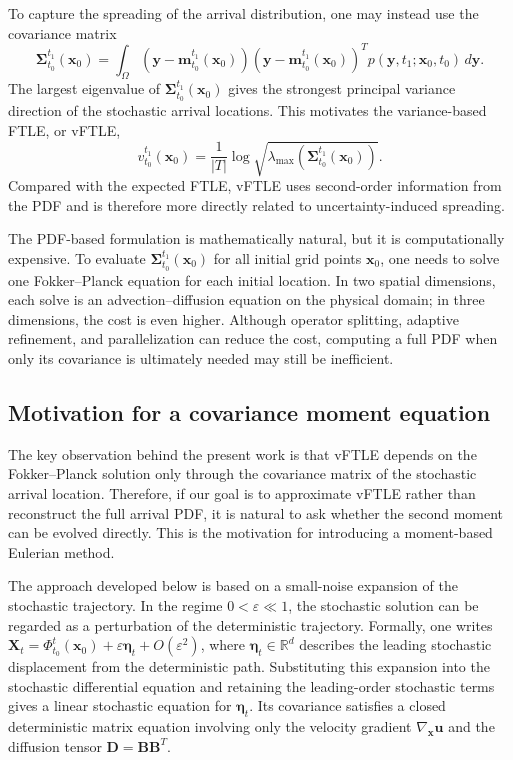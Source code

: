 \documentclass[a4paper,11pt]{article}
\numberwithin{equation}{section}
\theoremstyle{plain}
\theoremstyle{definition}
\theoremstyle{remark}
\newcommand{\R}{\mathbb{R}}
\newcommand{\bx}{\mathbf{x}}
\newcommand{\by}{\mathbf{y}}
\newcommand{\bu}{\mathbf{u}}
\newcommand{\bX}{\mathbf{X}}
\newcommand{\bB}{\mathbf{B}}
\newcommand{\bD}{\mathbf{D}}
\newcommand{\bSigma}{\boldsymbol{\Sigma}}
\newcommand{\etaVec}{\boldsymbol{\eta}}
\newcommand{\mean}{\mathbf{m}}
\begin{document}
To capture the spreading of the arrival distribution, one may instead use the covariance matrix
\begin{equation}
    \bSigma_{t_0}^{t_1}(\bx_0)
    =
    \int_\Omega
    \left(\by-\mean_{t_0}^{t_1}(\bx_0)\right)
    \left(\by-\mean_{t_0}^{t_1}(\bx_0)\right)^T
    p(\by,t_1;\bx_0,t_0)\,d\by .
    \label{eq:pdf_cov}
\end{equation}
The largest eigenvalue of \(\bSigma_{t_0}^{t_1}(\bx_0)\) gives the strongest principal variance direction of the stochastic arrival locations.  This motivates the variance-based FTLE, or vFTLE,
\begin{equation}
    v_{t_0}^{t_1}(\bx_0)=\frac{1}{|T|}\log\sqrt{\lambda_{\max}\left(\bSigma_{t_0}^{t_1}(\bx_0)\right)}.
    \label{eq:vftle_pdf}
\end{equation}
Compared with the expected FTLE, vFTLE uses second-order information from the PDF and is therefore more directly related to uncertainty-induced spreading.

The PDF-based formulation is mathematically natural, but it is computationally expensive.  To evaluate \(\bSigma_{t_0}^{t_1}(\bx_0)\) for all initial grid points \(\bx_0\), one needs to solve one Fokker--Planck equation for each initial location.  In two spatial dimensions, each solve is an advection--diffusion equation on the physical domain; in three dimensions, the cost is even higher.  Although operator splitting, adaptive refinement, and parallelization can reduce the cost, computing a full PDF when only its covariance is ultimately needed may still be inefficient.

\subsection{Motivation for a covariance moment equation}

The key observation behind the present work is that vFTLE depends on the Fokker--Planck solution only through the covariance matrix of the stochastic arrival location.  Therefore, if our goal is to approximate vFTLE rather than reconstruct the full arrival PDF, it is natural to ask whether the second moment can be evolved directly.  This is the motivation for introducing a moment-based Eulerian method.

The approach developed below is based on a small-noise expansion of the stochastic trajectory.  In the regime \(0<\varepsilon\ll 1\), the stochastic solution can be regarded as a perturbation of the deterministic trajectory.  Formally, one writes \(\bX_t=\Phi_{t_0}^{t}(\bx_0)+\varepsilon\etaVec_t+O(\varepsilon^2)\), where \(\etaVec_t\in\R^d\) describes the leading stochastic displacement from the deterministic path.  Substituting this expansion into the stochastic differential equation and retaining the leading-order stochastic terms gives a linear stochastic equation for \(\etaVec_t\).  Its covariance satisfies a closed deterministic matrix equation involving only the velocity gradient \(\nabla_{\bx}\bu\) and the diffusion tensor \(\bD=\bB\bB^T\).
\end{document}

